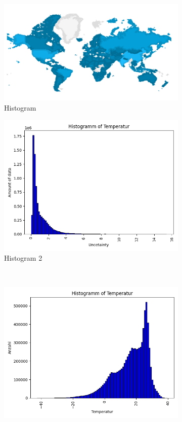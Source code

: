 \documentclass[manuscript,screen,review]{acmart}
\begin{document}
\begin{figure}[htp]
  \centering
  \begin{subfigure}{.45\textwidth}
      \centering
      \includegraphics[width=.8\linewidth]{./histograms/map_plot_data_points}
      \caption{Histogram}
      \label{fig:sub1}
  \end{subfigure}%
  \begin{subfigure}{.45\textwidth}
      \centering
      \includegraphics[width=.8\linewidth]{./histograms/Uncertainty}
      \caption{Histogram 2}
      \label{fig:sub2}
  \end{subfigure}\\
  \begin{subfigure}{.45\textwidth}
      \centering
      \includegraphics[width=.8\linewidth]{./histograms/Temperatur}

\end{subfigure}
\end{figure}
\end{document}
